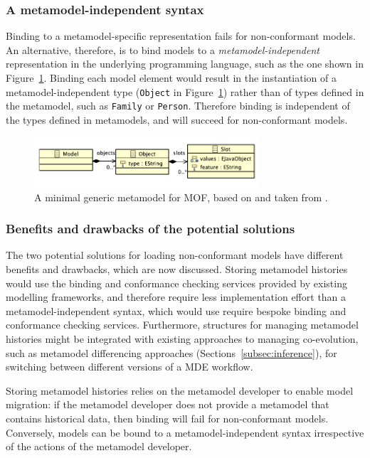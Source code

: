 \subsubsection{A metamodel-independent syntax}
Binding to a metamodel-specific representation fails for non-conformant models. An alternative, therefore, is to bind models to a \emph{metamodel-independent} representation in the underlying programming language, such as the one shown in Figure~\ref{fig:minimal_generic_metamodel}. Binding each model element would result in the instantiation of a metamodel-independent type (\texttt{Ob\-je\-ct} in Figure~\ref{fig:minimal_generic_metamodel}) rather than of types defined in the metamodel, such as \texttt{Fa\-mi\-ly} or \texttt{Pe\-rs\-on}. Therefore binding is independent of the types defined in metamodels, and will succeed for non-conformant models.

\begin{figure}[htbp]
  \centering
  \includegraphics[width=3.3in]{5.Implementation/slot_model.pdf}
  \caption[A minimal generic metamodel for MOF]{A minimal generic metamodel for MOF, based on \cite{mof} and taken from \cite{rose09enhanced}.}
  \label{fig:minimal_generic_metamodel}
\end{figure}
   
\subsubsection{Benefits and drawbacks of the potential solutions}
The two potential solutions for loading non-conformant models have different benefits and drawbacks, which are now discussed. Storing metamodel histories would use the binding and conformance checking services provided by existing modelling frameworks, and therefore require less implementation effort than a metamodel-independent syntax, which would use require bespoke binding and conformance checking services. Furthermore, structures for managing metamodel histories might be integrated with existing approaches to managing co-evolution, such as metamodel differencing approaches (Sections~\ref{subsec:inference}), for switching between different versions of a MDE workflow.

Storing metamodel histories relies on the metamodel developer to enable model migration: if the metamodel developer does not provide a metamodel that contains historical data, then binding will fail for non-conformant models. Conversely, models can be bound to a metamodel-independent syntax irrespective of the actions of the metamodel developer.

